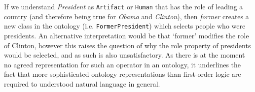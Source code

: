 \documentclass[11pt]{article}
\begin{document}
If we understand {\em President} as \texttt{Artifact} or \texttt{Human} that has the role of leading a country
(and therefore being true for {\em Obama} and {\em Clinton}), then {\em former} creates a new class in the ontology (i.e. \texttt{FormerPresident}) which selects
people who were presidents.  An alternative
    interpretation would be that `former' modifies the role of Clinton, however this raises the
    question of why the role property of presidents would be selected, and as such
is also unsatisfactory. %
As there is at the moment no agreed representation for such an operator in an
ontology, it underlines the fact that more sophisticated ontology representations than first-order logic are required to understood natural
language in general.
\end{document}
